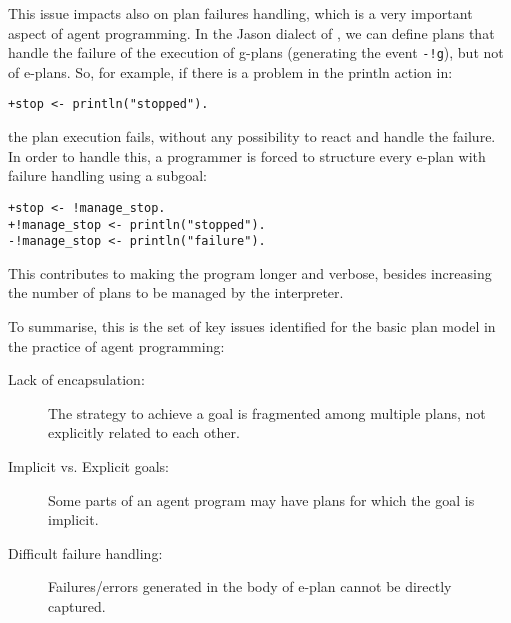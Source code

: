 This issue impacts also on plan failures handling, which is a very
important aspect of agent programming.
%
In the Jason dialect of {\asl}, we can define plans that handle the
failure of the execution of g-plans (generating the event
\texttt{-!g}), but not of e-plans.
%
So, for example, if there is a problem in the println action in:

\begin{small}
\begin{verbatim}
+stop <- println("stopped").
\end{verbatim}
\end{small}

\noindent the plan execution fails, without any possibility to react
and handle the failure.
%
In order to handle this, a programmer is forced to structure every
e-plan with failure handling using a subgoal:

\begin{small}
\begin{verbatim}
+stop <- !manage_stop.
+!manage_stop <- println("stopped").
-!manage_stop <- println("failure").
\end{verbatim}
\end{small}

\noindent This contributes to making the program longer and verbose,
besides increasing the number of plans to be managed by the
interpreter.


\bigskip

To summarise, this is the set of key issues identified for the basic
plan model in the practice of agent programming:
%
\begin{description}
%
\item[Lack of encapsulation:] The strategy to achieve a goal is
  fragmented among multiple plans, not explicitly related to each
  other.
%
\item[Implicit vs. Explicit goals:] Some parts of an agent program may
  have plans for which the goal is implicit.
%
\item[Difficult failure handling:] Failures/errors generated in the
  body of e-plan cannot be directly captured.
%
\end{description}



